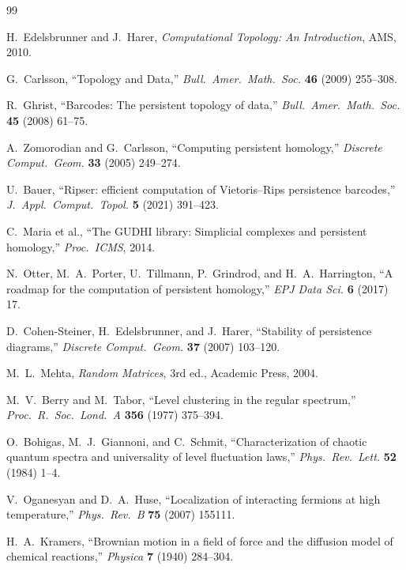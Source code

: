 \documentclass[12pt,a4paper]{article}
\theoremstyle{definition}\newtheorem{definition}[theorem]{Definition}
\theoremstyle{remark}\newtheorem{remark}[theorem]{Remark}
\begin{document}
\begin{thebibliography}{99}

H.~Edelsbrunner and J.~Harer, \textit{Computational Topology: An Introduction},
AMS, 2010.

G.~Carlsson, ``Topology and Data,'' \textit{Bull.\ Amer.\ Math.\ Soc.}
\textbf{46} (2009) 255--308.

R.~Ghrist, ``Barcodes: The persistent topology of data,''
\textit{Bull.\ Amer.\ Math.\ Soc.} \textbf{45} (2008) 61--75.

A.~Zomorodian and G.~Carlsson, ``Computing persistent homology,''
\textit{Discrete Comput.\ Geom.} \textbf{33} (2005) 249--274.

U.~Bauer, ``Ripser: efficient computation of Vietoris--Rips persistence barcodes,''
\textit{J.\ Appl.\ Comput.\ Topol.} \textbf{5} (2021) 391--423.

C.~Maria et al., ``The GUDHI library: Simplicial complexes and persistent homology,''
\textit{Proc.\ ICMS}, 2014.

N.~Otter, M.~A.~Porter, U.~Tillmann, P.~Grindrod, and H.~A.~Harrington,
``A roadmap for the computation of persistent homology,''
\textit{EPJ Data Sci.} \textbf{6} (2017) 17.

D.~Cohen-Steiner, H.~Edelsbrunner, and J.~Harer,
``Stability of persistence diagrams,''
\textit{Discrete Comput.\ Geom.} \textbf{37} (2007) 103--120.

M.~L.~Mehta, \textit{Random Matrices}, 3rd ed., Academic Press, 2004.

M.~V.~Berry and M.~Tabor, ``Level clustering in the regular spectrum,''
\textit{Proc.\ R.\ Soc.\ Lond.\ A} \textbf{356} (1977) 375--394.

O.~Bohigas, M.~J.~Giannoni, and C.~Schmit,
``Characterization of chaotic quantum spectra and universality of level
fluctuation laws,'' \textit{Phys.\ Rev.\ Lett.} \textbf{52} (1984) 1--4.

V.~Oganesyan and D.~A.~Huse, ``Localization of interacting fermions at high
temperature,'' \textit{Phys.\ Rev.\ B} \textbf{75} (2007) 155111.

H.~A.~Kramers, ``Brownian motion in a field of force and the diffusion model
of chemical reactions,'' \textit{Physica} \textbf{7} (1940) 284--304.


\end{thebibliography}
\end{document}
